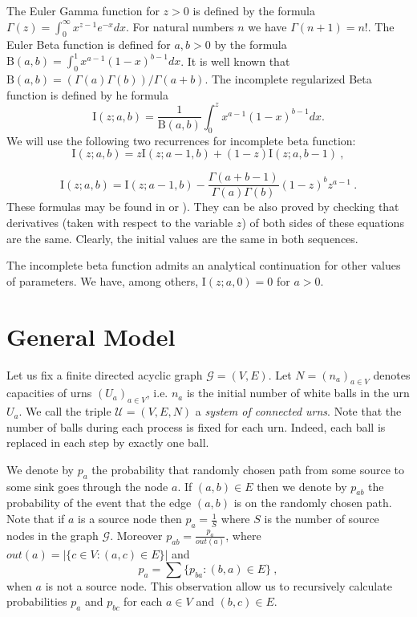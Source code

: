 \documentclass[submission]{dmtcs}
\newcommand{\Beta}[2]{\mathrm{B}(#1,#2)}
\newcommand{\IBETAREG}[3]{\mathrm{I}\left(#1;#2,#3\right)}
\begin{document}
The Euler Gamma function for $z>0$ is defined by the formula 
$\Gamma(z) = \int_{0}^{\infty} x^{z-1} e^{-x} dx$. For natural numbers $n$ we have
$\Gamma(n+1) = n!$. 
The Euler Beta function is defined for $a,b>0$ by the formula
$\Beta{a}{b} = \int_{0}^{1}x^{a-1}(1-x)^{b-1} dx$. It is well known that 
$\Beta{a}{b} = (\Gamma(a)\Gamma(b))/\Gamma(a+b)$.
The incomplete regularized Beta function is defined by he formula
$$
  \IBETAREG{z}{a}{b} = \frac{1}{\Beta{a}{b}} \int_{0}^{z} x^{a-1}(1-x)^{b-1} dx.
$$
We will use the following two recurrences for incomplete beta function:
\begin{equation}
  \label{icb:rec01}
  \IBETAREG{z}{a}{b} = z \IBETAREG{z}{a-1}{b} + (1-z) \IBETAREG{z}{a}{b-1} ~,
\end{equation}

\begin{equation}
  \label{icb:rec02}
  \IBETAREG{z}{a}{b} = 
  \IBETAREG{z}{a-1}{b} - \frac{\Gamma(a+b-1)}{\Gamma(a)\Gamma(b)} (1-z)^b z^{a-1}~. 
\end{equation}
These formulas may be found in \cite{WolframFS} or \cite{DLMF}). 
They can be also proved by checking that derivatives (taken with respect to the variable $z$)
of both sides of these equations are the same. Clearly, the initial values are the same in both 
sequences.

The incomplete beta function admits an analytical continuation for other values
of parameters. We have, among others, $\IBETAREG{z}{a}{0}=0$ for $a>0$.


\section{General Model}\label{General}

Let us fix a finite directed acyclic graph  $\mathcal{G} = (V,E)$.
Let $N=(n_a)_{a\in V}$ denotes capacities of urns $(U_a)_{a\in V}$, 
i.e. $n_a$ is the initial number of white balls in the urn $U_a$.
We call the triple $\mathcal{U} = (V,E,N)$ 
a \textit{system of connected urns}. Note that the number of balls during each process is 
fixed for each urn. Indeed, each ball is replaced in each step by exactly one ball. 




We denote by $p_a$ the probability that randomly chosen path 
from some source to some sink goes through the node $a$. 
If $(a,b) \in E$ then 
we denote by $p_{ab}$ the probability of the event that the edge $(a,b)$ 
is on the randomly chosen path.
Note that if $a$ is a source node then $p_a = \frac{1}{S}$ where $S$ is the 
number of source nodes in the graph $\mathcal{G}$.  
Moreover $p_{ab} = \frac{p_a}{out(a)}$, where 
$out(a) = |\{c\in V: (a,c)\in E\}|$ and
$$
	p_a = \sum \{p_{ba}: (b,a)\in E\} ~,
$$
when $a$ is not a source node. This observation allow us to recursively 
calculate probabilities $p_a$ and $p_{bc}$ for each $a\in V$ and 
$(b,c) \in E$.\\
\end{document}
